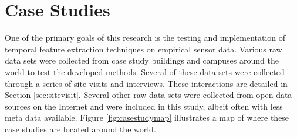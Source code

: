 \section{Case Studies}
\label{sec:casestudies}

One of the primary goals of this research is the testing and implementation of temporal feature extraction techniques on empirical sensor data. Various raw data sets were collected from case study buildings and campuses around the world to test the developed methods. Several of these data sets were collected through a series of site visits and interviews. These interactions are detailed in Section \ref{sec:sitevisit}. Several other raw data sets were collected from open data sources on the Internet and were included in this study, albeit often with less meta data available. Figure \ref{fig:casestudymap} illustrates a map of where these case studies are located around the world.
